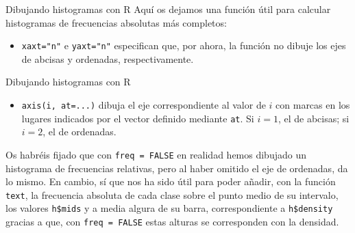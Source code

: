 \documentclass[
  ignorenonframetext,
  aspectratio=169]{beamer}
\newenvironment{Shaded}{\begin{snugshade}}{\end{snugshade}}
\newcommand{\AttributeTok}[1]{\textcolor[rgb]{0.13,0.29,0.53}{#1}}
\newcommand{\ConstantTok}[1]{\textcolor[rgb]{0.56,0.35,0.01}{#1}}
\newcommand{\ControlFlowTok}[1]{\textcolor[rgb]{0.13,0.29,0.53}{\textbf{#1}}}
\newcommand{\DecValTok}[1]{\textcolor[rgb]{0.00,0.00,0.81}{#1}}
\newcommand{\FunctionTok}[1]{\textcolor[rgb]{0.13,0.29,0.53}{\textbf{#1}}}
\newcommand{\NormalTok}[1]{#1}
\newcommand{\OtherTok}[1]{\textcolor[rgb]{0.56,0.35,0.01}{#1}}
\newcommand{\SpecialCharTok}[1]{\textcolor[rgb]{0.81,0.36,0.00}{\textbf{#1}}}
\newcommand{\StringTok}[1]{\textcolor[rgb]{0.31,0.60,0.02}{#1}}
\providecommand{\tightlist}{%
  \setlength{\itemsep}{0pt}\setlength{\parskip}{0pt}}
\begin{document}
\begin{frame}[fragile]{Dibujando histogramas con R}
\label{dibujando-histogramas-con-r-3}
Aquí os dejamos una función útil para calcular histogramas de
frecuencias absolutas más completos:

\begin{Shaded}
\end{Shaded}

\begin{itemize}
\tightlist
\item
  \texttt{xaxt="n"} e \texttt{yaxt="n"} especifican que, por ahora, la
  función no dibuje los ejes de abcisas y ordenadas, respectivamente.
\end{itemize}
\end{frame}

\begin{frame}[fragile]{Dibujando histogramas con R}
\label{dibujando-histogramas-con-r-4}
\begin{itemize}
\tightlist
\item
  \texttt{axis(i,\ at=...)} dibuja el eje correspondiente al valor de
  \(i\) con marcas en los lugares indicados por el vector definido
  mediante \texttt{at}. Si \(i=1\), el de abcisas; si \(i=2\), el de
  ordenadas.
\end{itemize}

Os habréis fijado que con \texttt{freq\ =\ FALSE} en realidad hemos
dibujado un histograma de frecuencias relativas, pero al haber omitido
el eje de ordenadas, da lo mismo. En cambio, sí que nos ha sido útil
para poder añadir, con la función \texttt{text}, la frecuencia absoluta
de cada clase sobre el punto medio de su intervalo, los valores
\texttt{h\$mids} y a media algura de su barra, correspondiente a
\texttt{h\$density} gracias a que, con \texttt{freq\ =\ FALSE} estas
alturas se corresponden con la densidad.
\end{frame}
\end{document}
